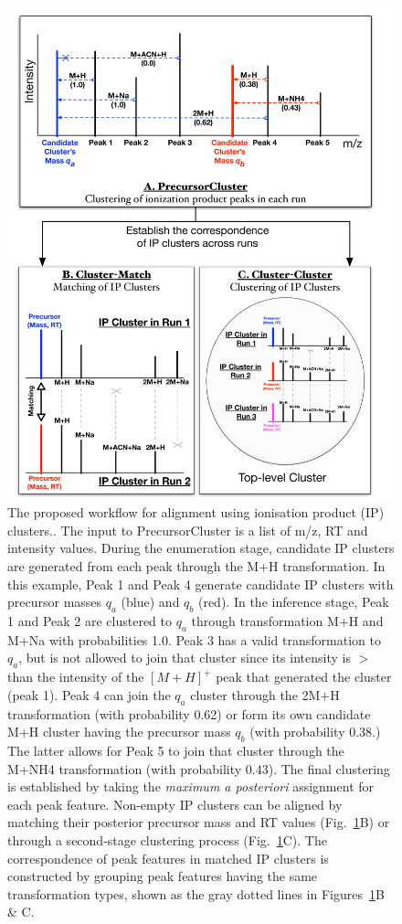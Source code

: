 \begin{figure}[!htbp]
\centering
\includegraphics[width=0.75\linewidth]{05-precursor-cluster/figures/fig1.pdf}
\caption[The proposed workflow for alignment using ionisation product (IP) clusters.]{\label{fig:01} The proposed workflow for alignment using ionisation product (IP) clusters.. The input to PrecursorCluster is a list of m/z, RT and intensity values. During the enumeration stage, candidate IP clusters are generated from each peak through the M+H transformation. In this example, Peak 1 and Peak 4 generate candidate IP clusters with precursor masses $q_a$ (blue) and $q_b$ (red). In the inference stage, Peak 1 and Peak 2 are clustered to $q_a$ through transformation M+H and M+Na with probabilities 1.0. Peak 3 has a valid transformation to $q_a$, but is not allowed to join that cluster since its intensity is $>$ than the intensity of the $[M+H]^+$ peak that generated the cluster (peak 1). Peak 4 can join the $q_a$ cluster through the 2M+H transformation (with probability 0.62) or form its own candidate M+H cluster having the precursor mass $q_b$ (with probability 0.38.) The latter allows for Peak 5 to join that cluster through the M+NH4 transformation (with probability 0.43). The final clustering is established by taking the \textit{maximum a posteriori} assignment for each peak feature. Non-empty IP clusters can be aligned by matching their posterior precursor mass and RT values (Fig.~\ref{fig:01}B) or through a second-stage clustering process (Fig.~\ref{fig:01}C). The correspondence of peak features in matched IP clusters is constructed by grouping peak features having the same transformation types, shown as the gray dotted lines in Figures~\ref{fig:01}B \& C.}
\end{figure}


